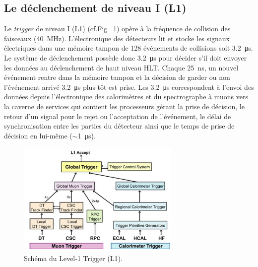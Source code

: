 \subsection{Le déclenchement de niveau I (L1)}
Le \textit{trigger} de niveau I (L1) (cf.Fig~ \ref{L1}) opère à la fréquence de collision des faisceaux (\SI{40}{\mega\hertz}). L'électronique des détecteurs lit et stocke les  signaux électriques dans une mémoire tampon de \num{128} événements de collisions soit \SI{3.2}{\micro\second}. Le système de déclenchement possède donc \SI{3.2}{\micro\second} pour  décider s'il doit envoyer les données au déclenchement de haut niveau HLT. Chaque \SI{25}{\nano\second}, un nouvel événement rentre dans la mémoire tampon et la décision de garder ou non l'événement arrivé \SI{3.2}{\micro\second} plus tôt est prise. Les \SI{3.2}{\micro\second} correspondent à l'envoi des données depuis l'électronique des calorimètres et du spectrographe à muons vers la caverne de services qui contient les processeurs gérant la prise de décision, le retour d'un signal pour le rejet ou l'acceptation de l'événement, le délai de synchronisation entre les parties du détecteur ainsi que le temps de prise de décision en lui-même ($\sim$\SI{1}{\micro\second}). 

	  \begin{figure}[ht!]
	\centering
	\includegraphics[width=0.70\textwidth]{CMS/L1.png}
	\captionsetup{type=figure}\caption{Schéma du Level-1 Trigger (L1).}
	\label{L1}
\end{figure}

